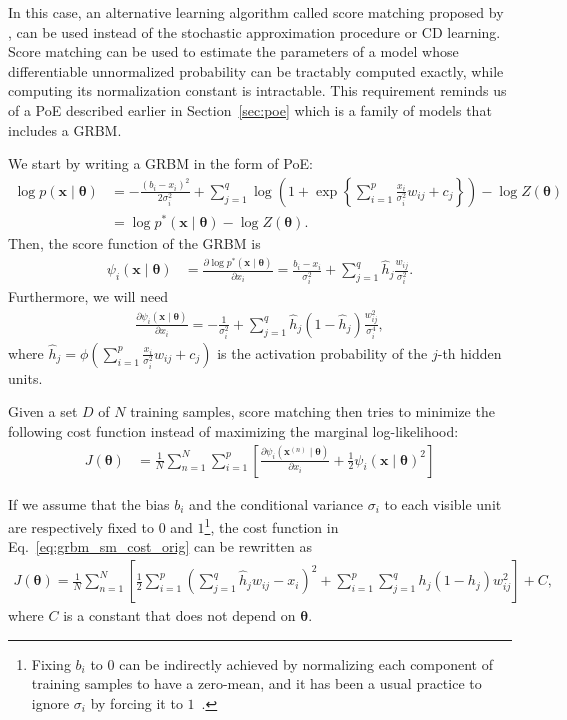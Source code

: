 \documentclass{now}
\newcommand{\vect}[1]{\mathbf{#1}}
\newcommand{\vects}[1]{\boldsymbol{#1}}
\newcommand{\vx}[0]{\vect{x}}
\newcommand{\TT}[0]{{\vects{\theta}}}
\begin{document}
In this case, an alternative learning algorithm called score matching proposed
by \citet{Hyvarinen2005}, can be used instead of the stochastic approximation
procedure or CD learning. Score matching can be used to estimate the parameters
of a model whose differentiable unnormalized probability can be tractably
computed exactly, while computing its normalization constant is intractable.
This requirement reminds us of a PoE described earlier in Section~\ref{sec:poe}
which is a family of models that includes a GRBM.

We start by writing a GRBM in the form of PoE:
\begin{align}
    \label{eq:grbm_poe}
    \log p(\vx \mid \TT) &= -\frac{(b_i - x_i)^2}{2\sigma_i^2}
    + \sum_{j=1}^q \log \left( 1 + \exp\left\{ \sum_{i=1}^p
    \frac{x_i}{\sigma_i^2} w_{ij} + c_j \right\}\right) -
    \log Z(\TT) 
    \nonumber \\
    &= \log p^*(\vx \mid \TT)  - \log Z(\TT).
\end{align}
Then, the score function of the GRBM is
\begin{align}
    \label{eq:grbm_score}
    \psi_i (\vx \mid \TT) &= \frac{\partial \log p^*(\vx \mid
    \TT)}{\partial x_i} 
    = \frac{b_i - x_i}{\sigma_i^2} + \sum_{j=1}^q \hat{h}_j
    \frac{w_{ij}}{\sigma_i^2}.
\end{align}
Furthermore, we will need
\begin{align*}
    \frac{\partial \psi_i(\vx \mid \TT)}{\partial x_i} =
    -\frac{1}{\sigma_i^2} + \sum_{j=1}^q \hat{h}_j (1 -
    \hat{h}_j) \frac{w_{ij}^2}{\sigma_i^4},
\end{align*}
where $\hat{h}_j = \phi\left( \sum_{i=1}^p \frac{x_i}{\sigma_i^2} w_{ij} + c_j
\right)$ is the activation probability of the $j$-th hidden units.

Given a set $D$ of $N$ training samples, score matching then tries to minimize
the following cost function instead of maximizing the marginal log-likelihood:
\begin{align}
    \label{eq:grbm_sm_cost_orig}
    J(\TT) &= \frac{1}{N} \sum_{n=1}^N \sum_{i=1}^p \left[
    \frac{\partial \psi_i(\vx^{(n)} \mid \TT)}{\partial x_i}
    + \frac{1}{2} \psi_i (\vx \mid \TT)^2
    \right]
\end{align}

If we assume that the bias $b_i$ and the conditional variance $\sigma_i$ to each
visible unit are respectively fixed to $0$ and $1$\footnote{ 
    Fixing $b_i$ to $0$ can be indirectly achieved by normalizing each component
    of training samples to have a zero-mean, and it has been a usual practice to
    ignore $\sigma_i$ by forcing it to $1$~\citep[see, e.g.,][]{Hinton2012rbm}.  
}, the cost function in Eq.~\eqref{eq:grbm_sm_cost_orig} can be rewritten as
\begin{align*}
    J(\TT) = \frac{1}{N} \sum_{n=1}^N \left[ \frac{1}{2}
    \sum_{i=1}^p \left( \sum_{j=1}^q \hat{h}_j w_{ij} - x_i
    \right)^2 + \sum_{i=1}^p \sum_{j=1}^q h_j(1 - h_j)
    w_{ij}^2 \right] + C,
\end{align*}
where $C$ is a constant that does not depend on $\TT$.
\end{document}
